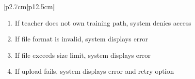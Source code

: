 \begin{table}[H]
\begin{tabular}{|p{2.7cm}|p{12.5cm}|}
\begin{minipage}[t]{\linewidth}
                                      \begin{enumerate}[topsep=0pt,itemsep=1pt,parsep=0pt,partopsep=0pt]
                                          \item If teacher does not own training path, system denies access
                                          \item If file format is invalid, system displays error
                                          \item If file exceeds size limit, system displays error
                                          \item If upload fails, system displays error and retry option
                                      \end{enumerate}
                                  \end{minipage} \\
        \hline
    \end{tabular}
    \label{tab:teacher-upload-video}
\end{table}
